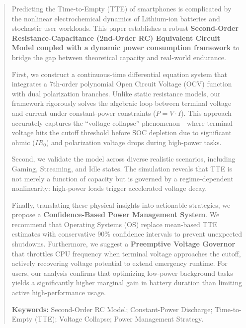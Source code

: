 \begin{abstract}
Predicting the Time-to-Empty (TTE) of smartphones is complicated by the nonlinear electrochemical dynamics of Lithium-ion batteries and stochastic user workloads. This paper establishes a robust \textbf{Second-Order Resistance-Capacitance (2nd-Order RC) Equivalent Circuit Model coupled with a dynamic power consumption framework} to bridge the gap between theoretical capacity and real-world endurance.

First, we construct a continuous-time differential equation system that integrates a 7th-order polynomial Open Circuit Voltage (OCV) function with dual polarization branches. Unlike static resistance models, our framework rigorously solves the algebraic loop between terminal voltage and current under constant-power constraints ($P = V \cdot I$). This approach accurately captures the ``voltage collapse'' phenomenon---where terminal voltage hits the cutoff threshold before SOC depletion due to significant ohmic ($IR_0$) and polarization voltage drops during high-power tasks.

Second, we validate the model across diverse realistic scenarios, including Gaming, Streaming, and Idle states. The simulation reveals that TTE is not merely a function of capacity but is governed by a regime-dependent nonlinearity: high-power loads trigger accelerated voltage decay. 

Finally, translating these physical insights into actionable strategies, we propose a \textbf{Confidence-Based Power Management System}. We recommend that Operating Systems (OS) replace mean-based TTE estimates with conservative 90\% confidence intervals to prevent unexpected shutdowns. Furthermore, we suggest a \textbf{Preemptive Voltage Governor} that throttles CPU frequency when terminal voltage approaches the cutoff, actively recovering voltage potential to extend emergency runtime. For users, our analysis confirms that optimizing low-power background tasks yields a significantly higher marginal gain in battery duration than limiting active high-performance usage.

\vspace{1em}
\noindent \textbf{Keywords:} Second-Order RC Model; Constant-Power Discharge; Time-to-Empty (TTE); Voltage Collapse; Power Management Strategy.
\end{abstract}
